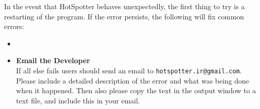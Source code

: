 \documentclass[a4paper,10pt]{article}
\makeatletter
\newcommand{\developeremail}{{\tt hotspotter.ir@gmail.com}}
\makeatother
\begin{document}
In the event that HotSpotter behaves unexpectedly, the first thing to try is a
restarting of the program. If the error persists, the following will fix common
errors: 

\begin{itemize}

    \item 

    \item \textbf{Email the Developer}\\
        If all else fails users should send an email to \developeremail{}.
        Please include a detailed description of the error and what was being done when it
            happened.  Then also please copy the text in the output window to a text file, and include this in your email.\\
    \end{itemize}
\end{document}
